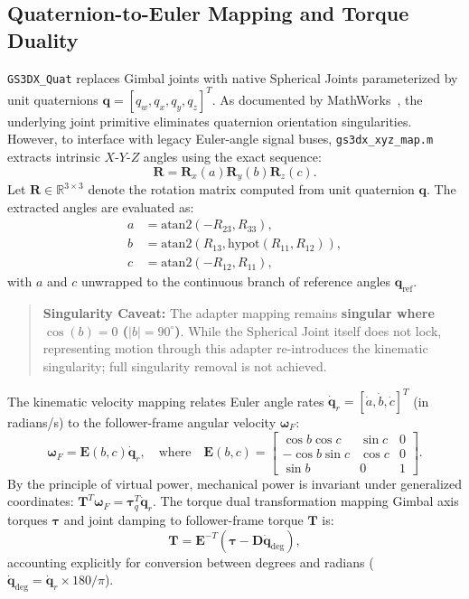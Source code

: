 \documentclass[11pt,a4paper]{article}
\begin{document}
\subsection{Quaternion-to-Euler Mapping and Torque Duality}
\texttt{GS3DX\_Quat} replaces Gimbal joints with native Spherical Joints parameterized by unit quaternions $\mathbf{q} = [q_w, q_x, q_y, q_z]^T$. As documented by MathWorks~\cite{MathWorksSpherical}, the underlying joint primitive eliminates quaternion orientation singularities. However, to interface with legacy Euler-angle signal buses, \texttt{gs3dx\_xyz\_map.m} extracts intrinsic $X$-$Y$-$Z$ angles using the exact sequence:
\begin{equation}
    \mathbf{R} = \mathbf{R}_x(a) \mathbf{R}_y(b) \mathbf{R}_z(c).
\end{equation}
Let $\mathbf{R} \in \mathbb{R}^{3 \times 3}$ denote the rotation matrix computed from unit quaternion $\mathbf{q}$. The extracted angles are evaluated as:
\begin{align}
    a &= \text{atan2}(-R_{23}, R_{33}), \\
    b &= \text{atan2}(R_{13}, \text{hypot}(R_{11}, R_{12})), \\
    c &= \text{atan2}(-R_{12}, R_{11}),
\end{align}
with $a$ and $c$ unwrapped to the continuous branch of reference angles $\mathbf{q}_{\text{ref}}$.
\begin{quote}
\textbf{Singularity Caveat:} The adapter mapping remains \textbf{singular where $\cos(b) = 0$ ($|b| = 90^\circ$)}. While the Spherical Joint itself does not lock, representing motion through this adapter re-introduces the kinematic singularity; full singularity removal is not achieved.
\end{quote}

The kinematic velocity mapping relates Euler angle rates $\dot{\mathbf{q}}_r = [\dot{a}, \dot{b}, \dot{c}]^T$ (in radians/s) to the follower-frame angular velocity $\boldsymbol{\omega}_F$:
\begin{equation}
    \boldsymbol{\omega}_F = \mathbf{E}(b, c) \dot{\mathbf{q}}_r, \quad \text{where} \quad \mathbf{E}(b, c) = \begin{bmatrix} \cos b \cos c & \sin c & 0 \\ -\cos b \sin c & \cos c & 0 \\ \sin b & 0 & 1 \end{bmatrix}.
\end{equation}
By the principle of virtual power, mechanical power is invariant under generalized coordinates: $\mathbf{T}^T \boldsymbol{\omega}_F = \boldsymbol{\tau}_q^T \dot{\mathbf{q}}_r$. The torque dual transformation mapping Gimbal axis torques $\boldsymbol{\tau}$ and joint damping to follower-frame torque $\mathbf{T}$ is:
\begin{equation}
    \mathbf{T} = \mathbf{E}^{-T} \left(\boldsymbol{\tau} - \mathbf{D} \dot{\mathbf{q}}_{\text{deg}}\right),
\end{equation}
accounting explicitly for conversion between degrees and radians ($\dot{\mathbf{q}}_{\text{deg}} = \dot{\mathbf{q}}_r \times 180 / \pi$).
\end{document}
